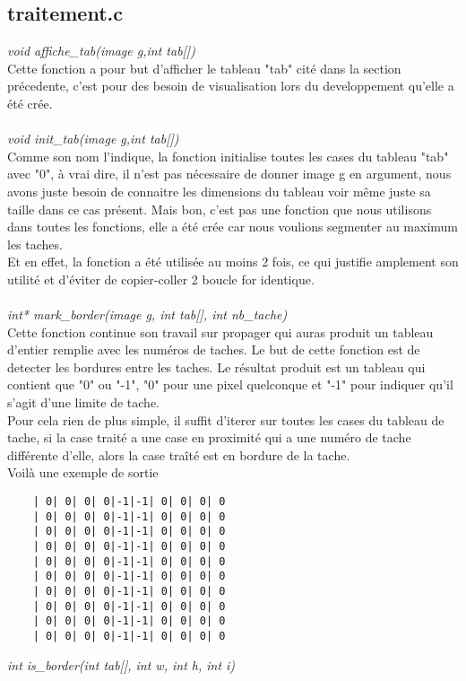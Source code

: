 \documentclass[12pt, letterpaper]{article}
\begin{document}
\subsection{traitement.c}
\textit{void affiche\_tab(image g,int tab[])}\\
Cette fonction a pour but d'afficher le tableau "tab" cité dans la section précedente, c'est pour des 
besoin de visualisation lors du developpement qu'elle a été crée.
\\\\
\textit{void init\_tab(image g,int tab[])}\\
Comme son nom l'indique, la fonction initialise toutes les cases du tableau "tab" avec "0", 
à vrai dire, il n'est pas nécessaire de donner image g en argument, nous avons juste besoin de connaitre les 
dimensions du tableau voir même juste sa taille dans ce cas présent. Mais bon, c'est pas une fonction que 
nous utilisons dans toutes les fonctions, elle a été crée car nous voulions segmenter au maximum les taches. \\
Et en effet, la fonction a été utilisée au moins 2 fois, ce qui justifie amplement son utilité et d'éviter de copier-coller 2 boucle for identique.
\\\\
\textit{int* mark\_border(image g, int tab[], int nb\_tache)}\\
Cette fonction continue son travail sur propager qui auras produit un tableau d'entier remplie avec 
les numéros de taches. Le but de cette fonction est de detecter les bordures entre les taches. 
Le résultat produit est un tableau qui contient que "0" ou "-1", "0" pour une pixel quelconque et "-1" 
pour indiquer qu'il s'agit d'une limite de tache.\\
Pour cela rien de plus simple, il suffit d'iterer sur toutes les cases du tableau de tache, si la case traité 
a une case en proximité qui a une numéro de tache différente d'elle, alors la case traîté est en bordure de la tache.\\ 
Voilà une exemple de sortie
\begin{lstlisting}
    | 0| 0| 0| 0|-1|-1| 0| 0| 0| 0
    | 0| 0| 0| 0|-1|-1| 0| 0| 0| 0
    | 0| 0| 0| 0|-1|-1| 0| 0| 0| 0
    | 0| 0| 0| 0|-1|-1| 0| 0| 0| 0
    | 0| 0| 0| 0|-1|-1| 0| 0| 0| 0
    | 0| 0| 0| 0|-1|-1| 0| 0| 0| 0
    | 0| 0| 0| 0|-1|-1| 0| 0| 0| 0
    | 0| 0| 0| 0|-1|-1| 0| 0| 0| 0
    | 0| 0| 0| 0|-1|-1| 0| 0| 0| 0
    | 0| 0| 0| 0|-1|-1| 0| 0| 0| 0
\end{lstlisting}
\textit{int is\_border(int tab[], int w, int h, int i)}\\
\end{document}
